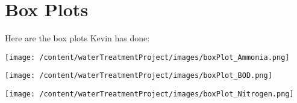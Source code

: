 \documentclass{article}
\begin{document}
\section*{Box Plots}

Here are the box plots Kevin has done:

\texttt{[image: /content/waterTreatmentProject/images/boxPlot\_Ammonia.png]}

\texttt{[image: /content/waterTreatmentProject/images/boxPlot\_BOD.png]}

\texttt{[image: /content/waterTreatmentProject/images/boxPlot\_Nitrogen.png]}
\end{document}
